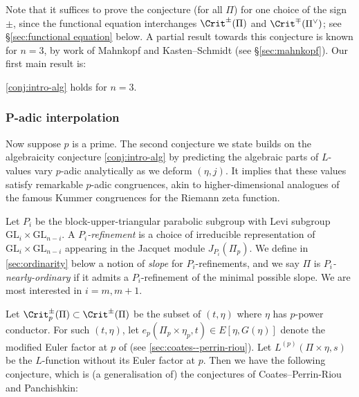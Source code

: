\documentclass[10pt,reqno,a4paper]{amsart}
\newcommand{\GL}{\mathrm{GL}}
\begin{document}
Note that it suffices to prove the conjecture (for all $\Pi$) for one choice of the sign $\pm$, since the functional equation interchanges $\Crit^{\pm}(\Pi)$ and $\Crit^{\mp}(\Pi^\vee)$; see  \S\ref{sec:functional equation} below. A partial result towards this conjecture is known for $n = 3$, by work of Mahnkopf and Kasten--Schmidt (see \S\ref{sec:mahnkopf}). Our first main result is:

\begin{theoremintro}\label{thm:intro-alg}
 \cref{conj:intro-alg} holds for $n = 3$.
\end{theoremintro}


\subsubsection*{P-adic interpolation}

Now suppose $p$ is a prime.  The second conjecture we state builds on the algebraicity conjecture \ref{conj:intro-alg} by predicting the algebraic parts of $L$-values vary $p$-adic analytically as we deform $(\eta,j)$. It implies that these values satisfy remarkable $p$-adic congruences, akin to higher-dimensional analogues of the famous Kummer congruences for the Riemann zeta function.

Let $P_i$ be the block-upper-triangular parabolic subgroup with Levi subgroup $\GL_i \times \GL_{n-i}$. A \emph{$P_i$-refinement} is a choice of irreducible representation of $\GL_i \times \GL_{n-i}$ appearing in the Jacquet module $J_{P_i}(\Pi_p)$. We define in \cref{sec:ordinarity} below a notion of \emph{slope} for $P_i$-refinements, and we say $\Pi$ is \emph{$P_i$-nearly-ordinary} if it admits a $P_i$-refinement of the minimal possible slope. We are most interested in $i = m, m+1$.

Let $\Crit_p^\pm(\Pi) \subset \Crit^\pm(\Pi)$ be the subset of $(t, \eta)$ where $\eta$ has $p$-power conductor. For such $(t, \eta)$, let  $e_p(\Pi_p \times \eta_p, t) \in E[\eta, G(\eta)]$ denote the modified Euler factor at $p$ of \cite[\S2]{coates89} (see \cref{sec:coates--perrin-riou}). Let $L^{(p)}(\Pi\times\eta, s)$ be the $L$-function without its Euler factor at $p$. Then we have the following conjecture, which is (a generalisation of) the conjectures of Coates--Perrin-Riou and Panchishkin:
\end{document}
